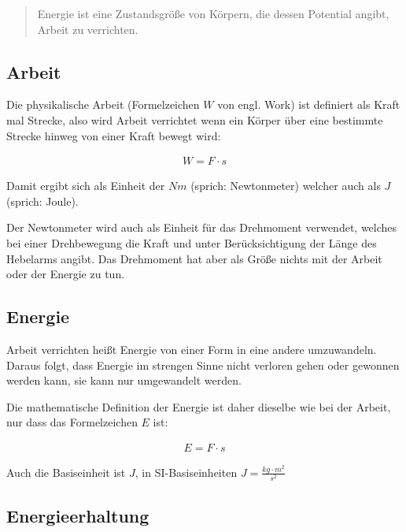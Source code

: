 \begin{quote}
\glqq Energie ist eine Zustandsgröße von Körpern, die dessen Potential angibt, Arbeit zu verrichten.\grqq
\end{quote}

\subsection{Arbeit}

Die physikalische \glqq Arbeit\grqq{} (Formelzeichen $W$ von engl. \glqq Work\grqq ) ist definiert als Kraft mal Strecke, also wird Arbeit verrichtet wenn ein Körper über eine bestimmte Strecke hinweg von einer Kraft bewegt wird:

\begin{align}
	W = F \cdot s
\end{align}

\noindent Damit ergibt sich als Einheit der $Nm$ (sprich: \glqq Newtonmeter\grqq ) welcher auch als $J$ (sprich: \glqq Joule\grqq ).

\begin{Anmerkung}
Der Newtonmeter wird auch als Einheit für das Drehmoment verwendet, welches bei einer Drehbewegung die Kraft und unter Berücksichtigung der Länge des Hebelarms angibt. Das Drehmoment hat aber als Größe nichts mit der Arbeit oder der Energie zu tun.
\end{Anmerkung}


\subsection{Energie}

\glqq Arbeit verrichten\grqq{} heißt Energie von einer Form in eine andere umzuwandeln. Daraus folgt, dass Energie im strengen Sinne nicht verloren gehen oder gewonnen werden kann, sie kann nur umgewandelt werden.

Die mathematische Definition der Energie ist daher dieselbe wie bei der Arbeit, nur dass das Formelzeichen $E$ ist:

\begin{align}	\label{eq:energiedef}
	E = F \cdot s
\end{align}

\noindent Auch die Basiseinheit ist $J$, in SI-Basiseinheiten $J=\frac{kg \cdot m^2}{s^2}$


\subsection{Energieerhaltung}

